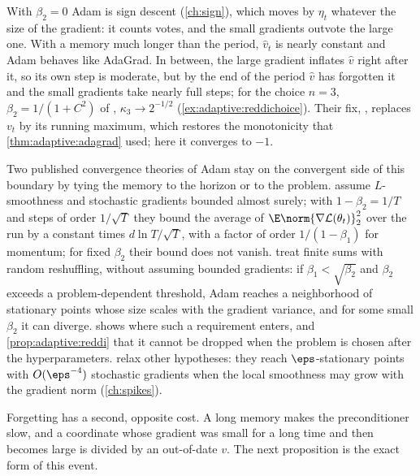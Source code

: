 \begin{refsection}
With $\beta_2=0$ Adam is sign descent (\cref{ch:sign}), which moves by $\eta_t$ whatever the size of the gradient: it counts votes, and the small gradients outvote the large one. With a memory much longer than the period, $\hat v_t$ is nearly constant and Adam behaves like AdaGrad. In between, the large gradient inflates $\hat v$ right after it, so its own step is moderate, but by the end of the period $\hat v$ has forgotten it and the small gradients take nearly full steps; for the choice $n=3$, $\beta_2=1/(1+C^2)$ of \textcite{ReddiKaleKumar2018}, $\kappa_3\to2^{-1/2}$ (\cref{ex:adaptive:reddichoice}). Their fix, , replaces $v_t$ by its running maximum, which restores the monotonicity that \cref{thm:adaptive:adagrad} used; here it converges to $-1$.

Two published convergence theories of Adam stay on the convergent side of this boundary by tying the memory to the horizon or to the problem. \Textcite{DefossezEtAl2022} assume $L$-smoothness and stochastic gradients bounded almost surely; with $1-\beta_2=1/T$ and steps of order $1/\sqrt T$ they bound the average of $\E\norm{\nabla\Loss(\theta_t)}_2^2$ over the run by a constant times $d\ln T/\sqrt T$, with a factor of order $1/(1-\beta_1)$ for momentum; for fixed $\beta_2$ their bound does not vanish. \Textcite{ZhangEtAl2022} treat finite sums with random reshuffling, without assuming bounded gradients: if $\beta_1<\sqrt{\beta_2}$ and $\beta_2$ exceeds a problem-dependent threshold, Adam reaches a neighborhood of stationary points whose size scales with the gradient variance, and for some small $\beta_2$ it can diverge.  shows where such a requirement enters, and \cref{prop:adaptive:reddi} that it cannot be dropped when the problem is chosen after the hyperparameters. \Textcite{LiRakhlinJadbabaie2023} relax other hypotheses: they reach $\eps$-stationary points with $O(\eps^{-4})$ stochastic gradients when the local smoothness may grow with the gradient norm (\cref{ch:spikes}).

Forgetting has a second, opposite cost. A long memory makes the preconditioner slow, and a coordinate whose gradient was small for a long time and then becomes large is divided by an out-of-date $v$. The next proposition is the exact form of this  event.


\end{refsection}
